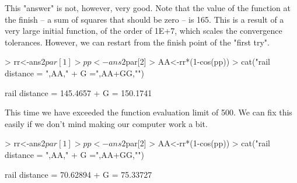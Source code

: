 \documentclass[11pt,letterpaper]{article}
\begin{document}
This "answer" is not, however, very good. Note that the value of the function at the finish -- a sum of squares that should be zero -- is 165. This is a result of a very large initial function, of the order of 1E+7, which scales the convergence tolerances. However, we can restart from the finish point of the "first try". 


\begin{Schunk}
\begin{Sinput}
> rr<-ans2$par[1]
> pp<-ans2$par[2]
> AA<-rr*(1-cos(pp)) 
> cat("rail distance = ",AA," + G =",AA+GG,"\n")
\end{Sinput}
\begin{Soutput}
rail distance =  145.4657  + G = 150.1741 
\end{Soutput}
\end{Schunk}

This time we have exceeded the function evaluation limit of 500. We can fix this easily if we don't mind making our computer work a bit. 

\begin{Schunk}
\begin{Sinput}
> rr<-ans2$par[1]
> pp<-ans2$par[2]
> AA<-rr*(1-cos(pp)) 
> cat("rail distance = ",AA," + G =",AA+GG,"\n")
\end{Sinput}
\begin{Soutput}
rail distance =  70.62894  + G = 75.33727 
\end{Soutput}
\end{Schunk}
\end{document}
